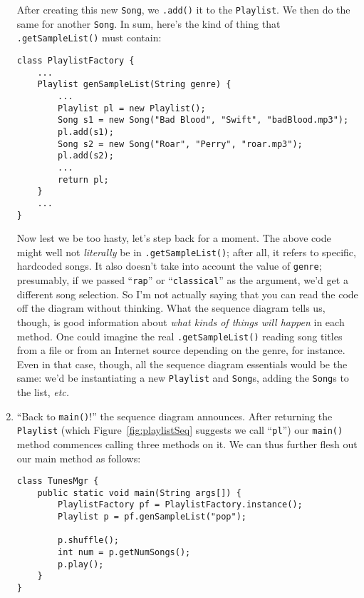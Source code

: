 \begin{enumerate}
After creating this new \texttt{Song}, we \texttt{.add()} it to the
\texttt{Playlist}. We then do the same for another \texttt{Song}. In sum,
here's the kind of thing that \texttt{.getSampleList()} must contain:

\begin{Verbatim}[fontsize=\footnotesize,samepage=true,frame=single]
class PlaylistFactory {
    ...
    Playlist genSampleList(String genre) {
        ...
        Playlist pl = new Playlist();
        Song s1 = new Song("Bad Blood", "Swift", "badBlood.mp3");
        pl.add(s1);
        Song s2 = new Song("Roar", "Perry", "roar.mp3");
        pl.add(s2);
		...
        return pl;
    }
    ...
}
\end{Verbatim}

Now lest we be too hasty, let's step back for a moment. The above code
might well not \textit{literally} be in \texttt{.getSampleList()}; after all,
it refers to specific, hardcoded songs. It also doesn't take into account the
value of \texttt{genre}; presumably, if we passed ``\texttt{rap}'' or
``\texttt{classical}'' as the argument, we'd get a different song selection. So
I'm not actually saying that you can read the code off the diagram without
thinking. What the sequence diagram tells us, though, is good information
about \textit{what kinds of things will happen} in each method. One could
imagine the real \texttt{.getSampleList()} reading song titles from a file or
from an Internet source depending on the genre, for instance. Even in that
case, though, all the sequence diagram essentials would be the same: we'd be
instantiating a new \texttt{Playlist} and \texttt{Song}s, adding the
\texttt{Song}s to the list, \textit{etc.}

\item ``Back to \texttt{main()}!'' the sequence diagram announces. After
returning the \texttt{Playlist} (which Figure~\ref{fig:playlistSeq} suggests
we call ``\texttt{pl}'') our \texttt{main()} method commences calling three
methods on it. We can thus further flesh out our main method as follows:

\begin{Verbatim}[fontsize=\footnotesize,samepage=true,frame=single]
class TunesMgr {
    public static void main(String args[]) {
        PlaylistFactory pf = PlaylistFactory.instance();
        Playlist p = pf.genSampleList("pop");

        p.shuffle();
        int num = p.getNumSongs();
        p.play();
    }
}
\end{Verbatim}


\end{enumerate}
